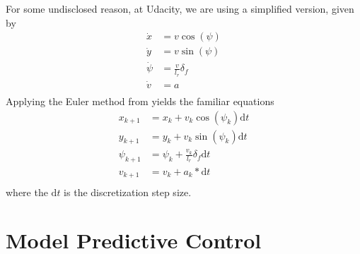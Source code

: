\documentclass[a4paper]{article}
\begin{document}
For some undisclosed reason, at Udacity, we are using a simplified version, given by
\begin{align}\label{eq:kinematic_bicycle_model_continuous_udacity}
\dot{x} 	&=  v \cos(\psi) \\
\dot{y} 	&=  v \sin(\psi) \\
\dot{\psi} 	&=  \frac{v}{l_r} \delta_f \\
\dot{v} 	&=  a \\
\end{align}
Applying the Euler method from  yields the familiar equations
\begin{align}\label{eq:kinematic_bicycle_model_discrete_udacity}
x_{k+1} 	&= x_k + v_k\cos(\psi_k) \mathrm{d}t \\
y_{k+1} 	&= y_k + v_k\sin(\psi_k) \mathrm{d}t \\
\psi_{k+1} 	&= \psi_k + \frac{v_k}{l_r}\delta_f \mathrm{d}t \\
v_{k+1} 	&= v_k + a_k*\mathrm{d}t \\
\end{align}
where the \( \mathrm{d}t \) is the discretization step size.




\section{Model Predictive Control}\label{sec:model_predictive_control}






\end{document}
